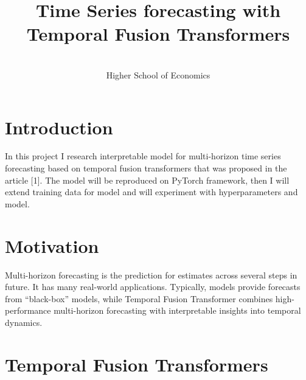 \documentclass[tablecaption=bottom,nowcp]{jmlr}%
\title{Time Series forecasting with Temporal Fusion Transformers}
\author{\Name{Damir Khabibulin}\\
  \addr Higher School of Economics}
\begin{document}
\maketitle


\section{Introduction}
\label{sec:intro}

In this project I research interpretable model for multi-horizon time series forecasting based on temporal fusion transformers that was proposed in the article [1]. The model will be reproduced on PyTorch framework, then I will extend training data for model and will experiment with hyperparameters and model.

\section{Motivation}
\label{sec:mot}

Multi-horizon forecasting is the prediction for estimates across several steps in future. It has many real-world applications. Typically, models provide forecasts from “black-box” models, while Temporal Fusion Transformer combines high-performance multi-horizon forecasting with interpretable insights into temporal dynamics.

\section{Temporal Fusion Transformers}
\label{sec:tft}
\end{document}
